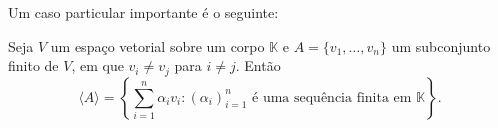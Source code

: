 Um caso particular importante é o seguinte:

\begin{corollary}
    Seja $V$ um espaço vetorial sobre um corpo $\mathbb K$ e $A=\{v_1, \dots, v_n\}$ um subconjunto finito de $V$, em que $v_i\neq v_j$ para $i \neq j$.
    Então \begin{equation*}
        \langle A \rangle = \left\{\sum_{i=1}^n \alpha_i v_i : (\alpha_i)_{i=1}^n \text{ é uma sequência finita em } \mathbb K\right\}.
    \end{equation*}
\end{corollary}